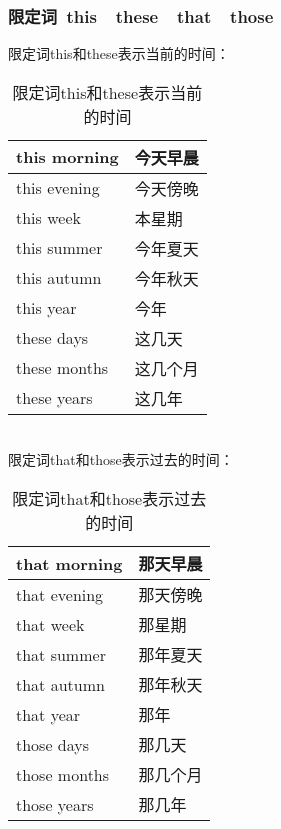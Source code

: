 \documentclass[UTF8]{ctexart}
\newcommand{\littf}[1]{{\hspace{3pt}\ttfamily #1}}
\begin{document}
\subsubsection{限定词~\littf{this}~~\littf{these}~~\littf{that}~~\littf{those}}
    限定词\littf{this}和\littf{these}表示当前的时间：\vspace{5pt}
    \begin{table}[h]
        \begin{center}
            \ttfamily
            \begin{tabular}{p{120pt}|p{80pt}}
                \hline
                this morning&今天早晨\\ \hline
                this evening&今天傍晚\\ \hline
                this week&本星期\\ \hline
                this summer&今年夏天\\ \hline
                this autumn&今年秋天\\ \hline
                this year&今年\\ \hline
                these days&这几天\\ \hline
                these months&这几个月\\ \hline
                these years&这几年\\ \hline
            \end{tabular}
            \rmfamily
            \caption{限定词\littf{this}和\littf{these}表示当前的时间}
        \end{center}
    \end{table}\\
    限定词\littf{that}和\littf{those}表示过去的时间：\vspace{5pt}
    \begin{table}[h]
        \begin{center}
            \ttfamily
            \begin{tabular}{p{120pt}|p{80pt}}
                \hline
                that morning&那天早晨\\ \hline
                that evening&那天傍晚\\ \hline
                that week&那星期\\ \hline
                that summer&那年夏天\\ \hline
                that autumn&那年秋天\\ \hline
                that year&那年\\ \hline
                those days&那几天\\ \hline
                those months&那几个月\\ \hline
                those years&那几年\\ \hline
            \end{tabular}
            \rmfamily
            \caption{限定词\littf{that}和\littf{those}表示过去的时间}
        \end{center}
    \end{table}\\
\end{document}
